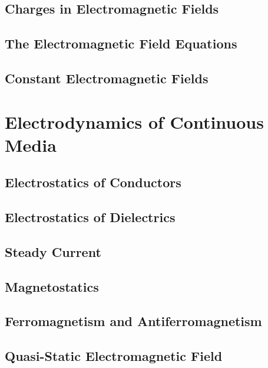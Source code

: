 \documentclass[
    ebook,
    11pt,
    oneside,
    onecolumn,
    openright,
    final
]{memoir}
\numberwithin{equation}{section}
\begin{document}
\chapter[Charges in EM Fields]{Charges in Electromagnetic Fields}




\chapter[The EM Field Equations]{The Electromagnetic Field Equations}

\chapter[Constant EM Fields]{Constant Electromagnetic Fields}

\part{Electrodynamics of Continuous Media}

\chapter{Electrostatics of Conductors}

\chapter{Electrostatics of Dielectrics}

\chapter{Steady Current}

\chapter{Magnetostatics}

\chapter{Ferromagnetism and Antiferromagnetism}

\chapter{Quasi-Static Electromagnetic Field}

\end{document}
